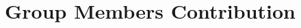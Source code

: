 \documentclass{article}
\begin{document}
\maketitle







\section{Group Members Contribution}
\end{document}
